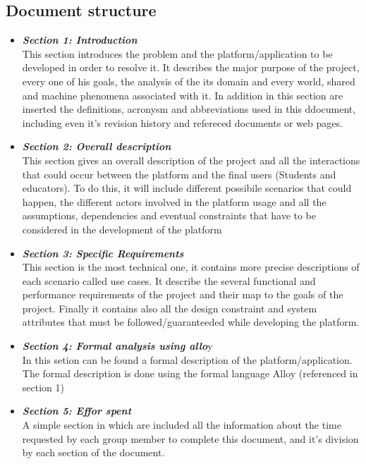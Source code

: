 \documentclass{article}
\begin{document}
{\subsection{Document structure}
    \begin{itemize}
        \item \textbf{\textit{Section 1: Introduction}} \\
        This section introduces the problem and the platform/application to be developed in order to resolve it. It describes the major purpose of the project, every one of his goals, the analysis of the its domain and every world, shared and machine phenomena associated with it.
        In addition in this section are inserted the definitions, acronysm and abbreviations used in this ddocument, including even it's revision history and refereced documents or web pages.
        \item \textbf{\textit{Section 2: Overall description}} \\
        This section gives an overall description of the project and all the interactions that could occur between the platform and the final users (Students and educators). To do this, it will include different possibile scenarios that could happen, the different actors involved in the platform usage and all the assumptions, dependencies and eventual constraints that have to be considered in the development of the platform
        \item \textbf{\textit{Section 3: Specific Requirements}} \\
        This section is the most technical one, it contains more precise descriptions of each scenario called use cases. It describe the several functional and performance requirements of the project and their map to the goals of the project.
        Finally it contains also all the design constraint and system attributes that must be followed/guaranteeded while developing the platform.
        \item \textbf{\textit{Section 4: Formal analysis using allo}}y \\
        In this setion can be found a formal description of the platform/application. The formal description is done using the formal language Alloy (referenced in section 1)
        \item \textbf{\textit{Section 5: Effor spent}} \\
        A simple section in which are included all the information about the time requested by each group member to complete this document, and it's division by each section of the document.
    \end{itemize}

}
\end{document}
